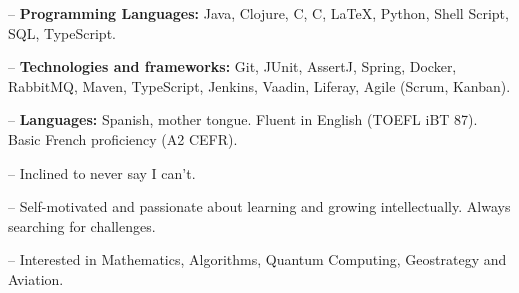 \documentclass[10pt,letterpaper]{article}
\newenvironment{indentsection}[1]%
{\begin{list}{}%
	{\setlength{\leftmargin}{#1}}%
	\item[]%
}
{\end{list}}
\newcommand{\CPP}
{C\nolinebreak[4]\hspace{-.05em}\raisebox{.22ex}{\footnotesize\bf ++}}
\begin{document}
\begin{indentsection}{\parindent}
\begin{description*}
	\item -- \textbf{Programming Languages:} Java, Clojure, C, \CPP, \LaTeX, Python, Shell Script, SQL, TypeScript.
	\item -- \textbf{Technologies and frameworks:} Git, JUnit, AssertJ, Spring, Docker, RabbitMQ, Maven, TypeScript, 
	Jenkins, Vaadin, Liferay, Agile (Scrum, Kanban).
	\item -- \textbf{Languages:} Spanish, mother tongue. Fluent in English (TOEFL iBT 87). Basic French proficiency (A2 CEFR).
	\item -- Inclined to never say I can't.
	\item -- Self-motivated and passionate about learning and growing intellectually. Always searching for challenges.
	\item -- Interested in Mathematics, Algorithms, Quantum Computing, Geostrategy and Aviation.
\end{description*}
\end{indentsection}
\end{document}
